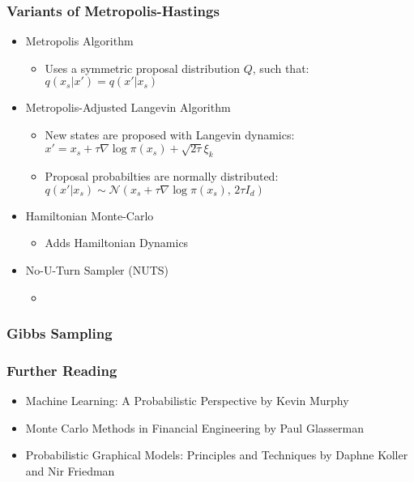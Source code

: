 \documentclass{beamer}
\begin{document}
\begin{frame}
\frametitle{Variants of Metropolis-Hastings}
\begin{itemize}
  \item Metropolis Algorithm
  \begin{itemize}
    \item Uses a symmetric proposal distribution $Q$, such that: \\
     $q(x_s|x') = q(x'|x_s)$
  \end{itemize}
  \item Metropolis-Adjusted Langevin Algorithm
  \begin{itemize}
    \item New states are proposed with Langevin dynamics: \\
      $x' = x_s + \tau \nabla \log \pi(x_s) + \sqrt{2 \tau} \xi_k$
    \item Proposal probabilties are normally distributed: \\
      $q(x'| x_s) \sim \mathcal{N}(x_s + \tau \nabla \log \pi(x_s), \, 2 \tau  I_d)$
  \end{itemize}
  \item Hamiltonian Monte-Carlo
  \begin{itemize}
    \item Adds Hamiltonian Dynamics
  \end{itemize}
  \item No-U-Turn Sampler (NUTS)
  \begin{itemize}
    \item
  \end{itemize}
\end{itemize}
\end{frame}




\begin{frame}
\frametitle{Gibbs Sampling}
\end{frame}



\begin{frame}
\frametitle{Further Reading}
  \begin{itemize}
    \item Machine Learning: A Probabilistic Perspective by Kevin Murphy
    \item Monte Carlo Methods in Financial Engineering by Paul Glasserman
    \item Probabilistic Graphical Models: Principles and Techniques by Daphne Koller and Nir Friedman
  \end{itemize}
\end{frame}



\end{document}
